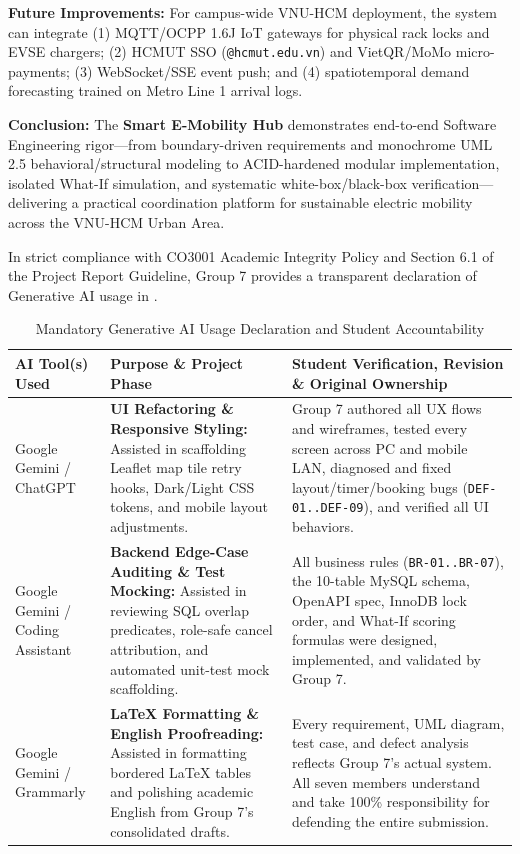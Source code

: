 \label{subsec:future-conclusion}
\textbf{Future Improvements:} For campus-wide VNU-HCM deployment, the system can integrate (1) MQTT/OCPP 1.6J IoT gateways for physical rack locks and EVSE chargers; (2) HCMUT SSO (\texttt{@hcmut.edu.vn}) and VietQR/MoMo micro-payments; (3) WebSocket/SSE event push; and (4) spatiotemporal demand forecasting trained on Metro Line 1 arrival logs.

\textbf{Conclusion:} The \textbf{Smart E-Mobility Hub} demonstrates end-to-end Software Engineering rigor—from boundary-driven requirements and monochrome UML 2.5 behavioral/structural modeling to ACID-hardened modular implementation, isolated What-If simulation, and systematic white-box/black-box verification—delivering a practical coordination platform for sustainable electric mobility across the VNU-HCM Urban Area.

\label{subsec:ai-declaration}
In strict compliance with CO3001 Academic Integrity Policy and Section 6.1 of the Project Report Guideline, Group 7 provides a transparent declaration of Generative AI usage in .

\begin{table}[H]
  \centering
  \singlespacing\footnotesize
  \caption{Mandatory Generative AI Usage Declaration and Student Accountability}
  \label{tab:ai-declaration}
  \renewcommand{\arraystretch}{1.25}
  \begin{tabularx}{\textwidth}{|L{2.8cm}|L{3.7cm}|Y|}
    \hline
    \textbf{AI Tool(s) Used} & \textbf{Purpose \& Project Phase} & \textbf{Student Verification, Revision \& Original Ownership} \\
    \hline
    Google Gemini / ChatGPT & \textbf{UI Refactoring \& Responsive Styling:} Assisted in scaffolding Leaflet map tile retry hooks, Dark/Light CSS tokens, and mobile layout adjustments. & Group 7 authored all UX flows and wireframes, tested every screen across PC and mobile LAN, diagnosed and fixed layout/timer/booking bugs (\texttt{DEF-01..DEF-09}), and verified all UI behaviors. \\
    \hline
    Google Gemini / Coding Assistant & \textbf{Backend Edge-Case Auditing \& Test Mocking:} Assisted in reviewing SQL overlap predicates, role-safe cancel attribution, and automated unit-test mock scaffolding. & All business rules (\texttt{BR-01..BR-07}), the 10-table MySQL schema, OpenAPI spec, InnoDB lock order, and What-If scoring formulas were designed, implemented, and validated by Group 7. \\
    \hline
    Google Gemini / Grammarly & \textbf{LaTeX Formatting \& English Proofreading:} Assisted in formatting bordered LaTeX tables and polishing academic English from Group 7's consolidated drafts. & Every requirement, UML diagram, test case, and defect analysis reflects Group 7's actual system. All seven members understand and take 100\% responsibility for defending the entire submission. \\
    \hline
  \end{tabularx}
\end{table}

